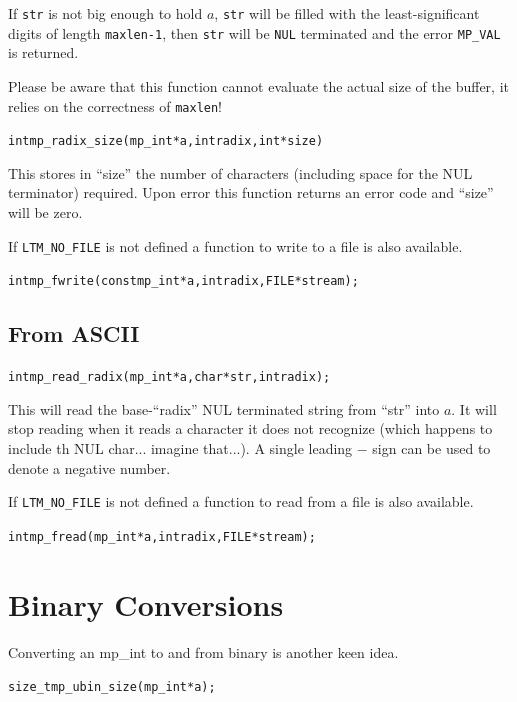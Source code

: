 \documentclass[synpaper]{book}
\begin{document}
If \texttt{str} is not big enough to hold $a$, \texttt{str} will be filled with the least-significant digits
of length \texttt{maxlen-1}, then \texttt{str} will be \texttt{NUL} terminated and the error \texttt{MP\_VAL} is returned.

Please be aware that this function cannot evaluate the actual size of the buffer, it relies on the correctness of \texttt{maxlen}!

\begin{alltt}
int mp_radix_size (mp_int * a, int radix, int *size)
\end{alltt}
This stores in ``size'' the number of characters (including space for the NUL terminator) required.  Upon error this
function returns an error code and ``size'' will be zero.

If \texttt{LTM\_NO\_FILE} is not defined a function to write to a file is also available.
\begin{alltt}
int mp_fwrite(const mp_int *a, int radix, FILE *stream);
\end{alltt}

\subsection{From ASCII}
\begin{alltt}
int mp_read_radix (mp_int * a, char *str, int radix);
\end{alltt}
This will read the base-``radix'' NUL terminated string from ``str'' into $a$.  It will stop reading when it reads a
character it does not recognize (which happens to include th NUL char... imagine that...).  A single leading $-$ sign
can be used to denote a negative number.

If \texttt{LTM\_NO\_FILE} is not defined a function to read from a file is also available.
\begin{alltt}
int mp_fread(mp_int *a, int radix, FILE *stream);
\end{alltt}

\section{Binary Conversions}

Converting an mp\_int to and from binary is another keen idea.

\begin{alltt}
size_t mp_ubin_size(mp_int *a);
\end{alltt}
\end{document}
